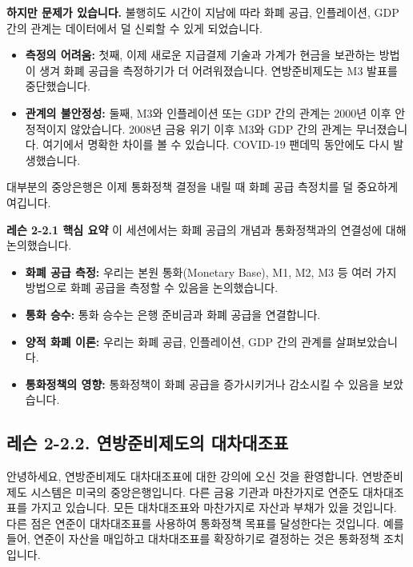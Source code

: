 \documentclass[11pt,a4paper]{article}
\begin{document}
\textbf{하지만 문제가 있습니다.}
불행히도 시간이 지남에 따라 화폐 공급, 인플레이션, GDP 간의 관계는 데이터에서 덜 신뢰할 수 있게 되었습니다.
\begin{itemize}
    \item \textbf{측정의 어려움:} 첫째, 이제 새로운 지급결제 기술과 가계가 현금을 보관하는 방법이 생겨 화폐 공급을 측정하기가 더 어려워졌습니다. 연방준비제도는 M3 발표를 중단했습니다.
    \item \textbf{관계의 불안정성:} 둘째, M3와 인플레이션 또는 GDP 간의 관계는 2000년 이후 안정적이지 않았습니다. 2008년 금융 위기 이후 M3와 GDP 간의 관계는 무너졌습니다. 여기에서 명확한 차이를 볼 수 있습니다. COVID-19 팬데믹 동안에도 다시 발생했습니다.
\end{itemize}
대부분의 중앙은행은 이제 통화정책 결정을 내릴 때 화폐 공급 측정치를 덜 중요하게 여깁니다.

\begin{summarybox}
\textbf{레슨 2-2.1 핵심 요약}
이 세션에서는 화폐 공급의 개념과 통화정책과의 연결성에 대해 논의했습니다.
\begin{itemize}
    \item \textbf{화폐 공급 측정:} 우리는 본원 통화(Monetary Base), M1, M2, M3 등 여러 가지 방법으로 화폐 공급을 측정할 수 있음을 논의했습니다.
    \item \textbf{통화 승수:} 통화 승수는 은행 준비금과 화폐 공급을 연결합니다.
    \item \textbf{양적 화폐 이론:} 우리는 화폐 공급, 인플레이션, GDP 간의 관계를 살펴보았습니다.
    \item \textbf{통화정책의 영향:} 통화정책이 화폐 공급을 증가시키거나 감소시킬 수 있음을 보았습니다.
\end{itemize}
\end{summarybox}

\newpage
\subsection{레슨 2-2.2. 연방준비제도의 대차대조표}

안녕하세요, 연방준비제도 대차대조표에 대한 강의에 오신 것을 환영합니다. 연방준비제도 시스템은 미국의 중앙은행입니다. 다른 금융 기관과 마찬가지로 연준도 대차대조표를 가지고 있습니다. 모든 대차대조표와 마찬가지로 자산과 부채가 있을 것입니다. 다른 점은 연준이 대차대조표를 사용하여 통화정책 목표를 달성한다는 것입니다. 예를 들어, 연준이 자산을 매입하고 대차대조표를 확장하기로 결정하는 것은 통화정책 조치입니다.
\end{document}
